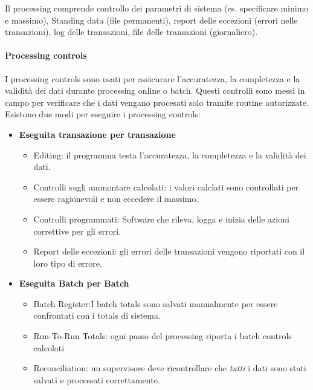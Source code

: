 Il processing comprende controllo dei parametri di sistema (es. specificare
minimo e massimo), Standing data (file permanenti), report delle eccezioni
(errori nelle transazioni), log delle transazioni, file delle transazioni
(giornaliero).

\paragraph{Processing controls}
I processing controls sono usati per assicurare
l'accuratezza, la completezza e la validità dei dati durante
processing online o batch. Questi controlli sono messi in campo
per verificare che i dati vengano procesati solo tramite routine
autorizzate. Esistono due modi per eseguire i processing controls:

\begin{itemize}
\item \textbf{Eseguita transazione per transazione}
\begin{itemize}
\item Editing: il programma testa l'accuratezza, la completezza
e la validità dei dati.
\item Controlli sugli ammontare calcolati: i valori calclati
sono controllati per essere ragionevoli e non eccedere il massimo.
\item Controlli programmati: Software che rileva, logga e inizia
delle azioni correttive per gli errori.
\item Report delle eccezioni: gli errori delle transazioni vengono
riportati con il loro tipo di errore.
\end{itemize}

\item \textbf{Eseguita Batch per Batch}

\begin{itemize}
\item Batch Register:I batch totals sono salvati manualmente per essere
confrontati con i totals di sistema. 
\item Run-To-Run Totals: ogni passo del processing riporta i batch
controls calcolati
\item Reconciliation: un supervisore deve ricontrollare che \emph{tutti}
i dati sono stati salvati e processati correttamente.
\end{itemize}
\end{itemize}


